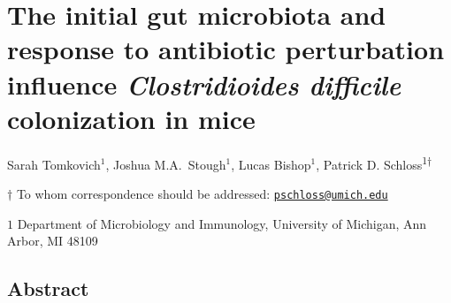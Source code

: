\documentclass[11pt,]{article}
\title{}
\author{}
\date{}
\begin{document}
\vspace{35mm}

\section{\texorpdfstring{The initial gut microbiota and response to
antibiotic perturbation influence \emph{Clostridioides difficile}
colonization in
mice}{The initial gut microbiota and response to antibiotic perturbation influence Clostridioides difficile colonization in mice}}\label{the-initial-gut-microbiota-and-response-to-antibiotic-perturbation-influence-clostridioides-difficile-colonization-in-mice}

\vspace{35mm}

Sarah Tomkovich\({^1}\), Joshua M.A.~Stough\({^1}\), Lucas
Bishop\({^1}\), Patrick D. Schloss\textsuperscript{1\(\dagger\)}

\vspace{40mm}

\(\dagger\) To whom correspondence should be addressed:
\href{mailto:pschloss@umich.edu}{\nolinkurl{pschloss@umich.edu}}

\(1\) Department of Microbiology and Immunology, University of Michigan,
Ann Arbor, MI 48109

\newpage

\linenumbers

\subsection{Abstract}\label{abstract}
\end{document}
